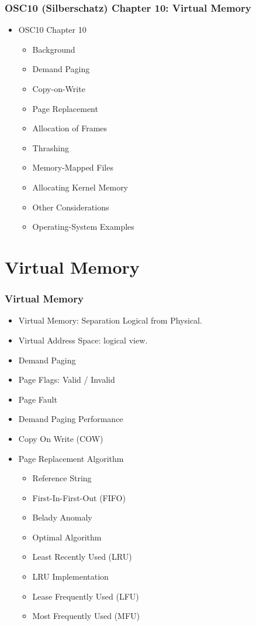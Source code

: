 \documentclass[aspectratio=169, xcolor=table, notheorems, hyperref={pdfpagelabels=false}]{beamer}
\begin{document}
\begin{frame}
\frametitle{OSC10 (Silberschatz) Chapter 10: Virtual Memory}
  \begin{itemize}
  \item OSC10 Chapter 10
  \begin{itemize}
  \item Background
  \item Demand Paging
  \item Copy-on-Write
  \item Page Replacement
  \item Allocation of Frames
  \item Thrashing
  \item Memory-Mapped Files
  \item Allocating Kernel Memory
  \item Other Considerations
  \item Operating-System Examples
  \end{itemize}
  \end{itemize}
  \vfill \null
\end{frame}


\section{Virtual Memory}
\begin{frame}
\frametitle{Virtual Memory}
\begin{itemize}
\item Virtual Memory: Separation Logical from Physical.
\item Virtual Address Space: logical view.
\item Demand Paging
\item Page Flags: Valid / Invalid
\item Page Fault
\item Demand Paging Performance
\item Copy On Write (COW)
\item Page Replacement Algorithm
\begin{itemize}
\item Reference String
\item First-In-First-Out (FIFO)
\item Belady Anomaly
\item Optimal Algorithm
\item Least Recently Used (LRU)
\item LRU Implementation
\item Lease Frequently Used (LFU)
\item Most Frequently Used (MFU) 
\end{itemize}
\end{itemize}
\end{frame}
\end{document}
